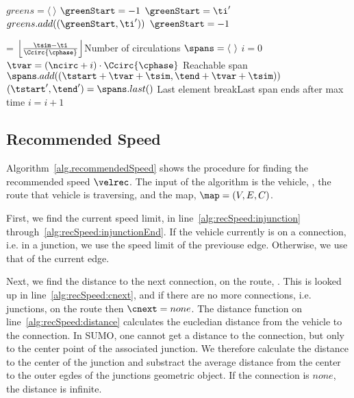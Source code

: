 \begin{algorithm}
\caption{$getSpans(\con, \ti)$}\label{alg.getSpans}
\begin{algorithmic}[1]
\State $greens = \langle\ \rangle$
\State $\greenStart = -1$
\label{alg:getSpans:GreensFor}
\label{alg:getSpans:GreenBegin}
\State $\greenStart = \ti'$
\label{alg:getSpans:GreenEnd}
\State $greens.add((\greenStart, \ti'))$
\State $\greenStart=-1$
\EndIf
\EndFor\label{alg:getSpans:GreensEnd}

\State \ncirc = $\left \lfloor \frac{\tsim-\ti}{\Ccirc{\cphase}} \right \rfloor$\Comment Number of circulations\label{alg:getSpans:ncirc}
\State $\spans = \langle\ \rangle$\label{alg:getSpans:initSpans}
\State $i = 0$\label{alg:getSpans:i}
\label{alg:getSpans:whilebegin}
\label{alg:getSpans:forbegin}
\State $\tvar = (\ncirc+i)\cdot \Ccirc{\cphase}$\label{alg:getSpans:tvar}
\If {$\tend+\tvar> \tsim-\ti$}\Comment Reachable span
\State $\spans.add((\tstart + \tvar+\tsim, \tend + \tvar+ \tsim))$\label{alg:getSpans:add}
\EndIf
\EndFor
\State $(\tstart',\tend') = \spans.last()$ \Comment Last element
\label{alg:getSpans:breakCond}
\State break\Comment Last span ends after max time
\EndIf
\State $i=i+1$
\EndWhile
\State\Return \spans
\end{algorithmic}
\end{algorithm}



\subsection{Recommended Speed}
Algorithm~\ref{alg.recommendedSpeed} shows the procedure for finding the recommended speed $\velrec$.
The input of the algorithm is the vehicle, \veh, the route that vehicle is traversing, \route and the map, $\map = (V, E, C)$.

First, we find the current speed limit, \velmax in line~\ref{alg:recSpeed:injunction} through~\ref{alg:recSpeed:injunctionEnd}. %
If the vehicle currently is on a connection, i.e. in a junction, we use the speed limit of the previouse edge.
Otherwise, we use that of the current edge.

Next, we find the distance to the next connection, \cnext on the route, \route. 
This is looked up in line~\ref{alg:recSpeed:cnext}, and if there are no more connections, i.e. junctions, on the route then $\cnext=none$.
The distance function on line~\ref{alg:recSpeed:distance} calculates the eucledian distance from the vehicle to the connection.
In SUMO, one cannot get a distance to the connection, but only to the center point of the associated junction.
We therefore calculate the distance to the center of the junction and substract the average distance from the center to the outer egdes of the junctions geometric object. %
If the connection is $none$, the distance is infinite.

